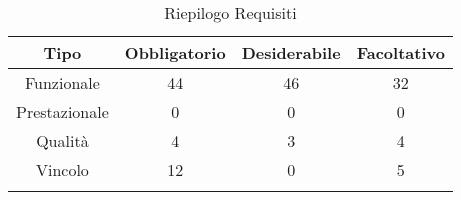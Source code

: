 \normalsize
\begin{longtable}{|c|c|c|c|}
\hline
\textbf{Tipo} & \textbf{Obbligatorio} & \textbf{Desiderabile} & \textbf{Facoltativo}\\
\hline
Funzionale & 44 & 46 & 32\\ \hline
Prestazionale & 0 & 0 & 0\\ \hline
Qualità & 4 & 3 & 4\\ \hline
Vincolo & 12 & 0 & 5\\ \hline
\caption[Riepilogo Requisiti]{Riepilogo Requisiti}
\label{tabella:riepilogorequi}
\end{longtable}
\clearpage
